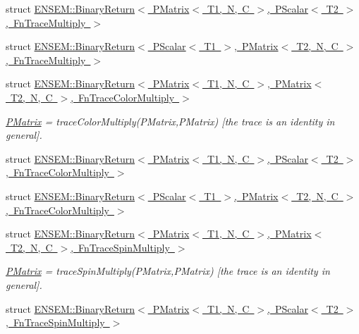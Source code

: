 \begin{DoxyCompactItemize}
\item 
struct \mbox{\hyperlink{structENSEM_1_1BinaryReturn_3_01PMatrix_3_01T1_00_01N_00_01C_01_4_00_01PScalar_3_01T2_01_4_00_01FnTraceMultiply_01_4}{E\+N\+S\+E\+M\+::\+Binary\+Return$<$ P\+Matrix$<$ T1, N, C $>$, P\+Scalar$<$ T2 $>$, Fn\+Trace\+Multiply $>$}}
\item 
struct \mbox{\hyperlink{structENSEM_1_1BinaryReturn_3_01PScalar_3_01T1_01_4_00_01PMatrix_3_01T2_00_01N_00_01C_01_4_00_01FnTraceMultiply_01_4}{E\+N\+S\+E\+M\+::\+Binary\+Return$<$ P\+Scalar$<$ T1 $>$, P\+Matrix$<$ T2, N, C $>$, Fn\+Trace\+Multiply $>$}}
\item 
struct \mbox{\hyperlink{structENSEM_1_1BinaryReturn_3_01PMatrix_3_01T1_00_01N_00_01C_01_4_00_01PMatrix_3_01T2_00_01N_00_d90c323b0eef8bf9c5abb3303bff0c7e}{E\+N\+S\+E\+M\+::\+Binary\+Return$<$ P\+Matrix$<$ T1, N, C $>$, P\+Matrix$<$ T2, N, C $>$, Fn\+Trace\+Color\+Multiply $>$}}
\begin{DoxyCompactList}\small\item\em \mbox{\hyperlink{classENSEM_1_1PMatrix}{P\+Matrix}} = trace\+Color\+Multiply(\+P\+Matrix,\+P\+Matrix) \mbox{[}the trace is an identity in general\mbox{]}. \end{DoxyCompactList}\item 
struct \mbox{\hyperlink{structENSEM_1_1BinaryReturn_3_01PMatrix_3_01T1_00_01N_00_01C_01_4_00_01PScalar_3_01T2_01_4_00_01FnTraceColorMultiply_01_4}{E\+N\+S\+E\+M\+::\+Binary\+Return$<$ P\+Matrix$<$ T1, N, C $>$, P\+Scalar$<$ T2 $>$, Fn\+Trace\+Color\+Multiply $>$}}
\item 
struct \mbox{\hyperlink{structENSEM_1_1BinaryReturn_3_01PScalar_3_01T1_01_4_00_01PMatrix_3_01T2_00_01N_00_01C_01_4_00_01FnTraceColorMultiply_01_4}{E\+N\+S\+E\+M\+::\+Binary\+Return$<$ P\+Scalar$<$ T1 $>$, P\+Matrix$<$ T2, N, C $>$, Fn\+Trace\+Color\+Multiply $>$}}
\item 
struct \mbox{\hyperlink{structENSEM_1_1BinaryReturn_3_01PMatrix_3_01T1_00_01N_00_01C_01_4_00_01PMatrix_3_01T2_00_01N_00_27c89d09a7160e4b94859894ef7b979a}{E\+N\+S\+E\+M\+::\+Binary\+Return$<$ P\+Matrix$<$ T1, N, C $>$, P\+Matrix$<$ T2, N, C $>$, Fn\+Trace\+Spin\+Multiply $>$}}
\begin{DoxyCompactList}\small\item\em \mbox{\hyperlink{classENSEM_1_1PMatrix}{P\+Matrix}} = trace\+Spin\+Multiply(\+P\+Matrix,\+P\+Matrix) \mbox{[}the trace is an identity in general\mbox{]}. \end{DoxyCompactList}\item 
struct \mbox{\hyperlink{structENSEM_1_1BinaryReturn_3_01PMatrix_3_01T1_00_01N_00_01C_01_4_00_01PScalar_3_01T2_01_4_00_01FnTraceSpinMultiply_01_4}{E\+N\+S\+E\+M\+::\+Binary\+Return$<$ P\+Matrix$<$ T1, N, C $>$, P\+Scalar$<$ T2 $>$, Fn\+Trace\+Spin\+Multiply $>$}}

\end{DoxyCompactItemize}
